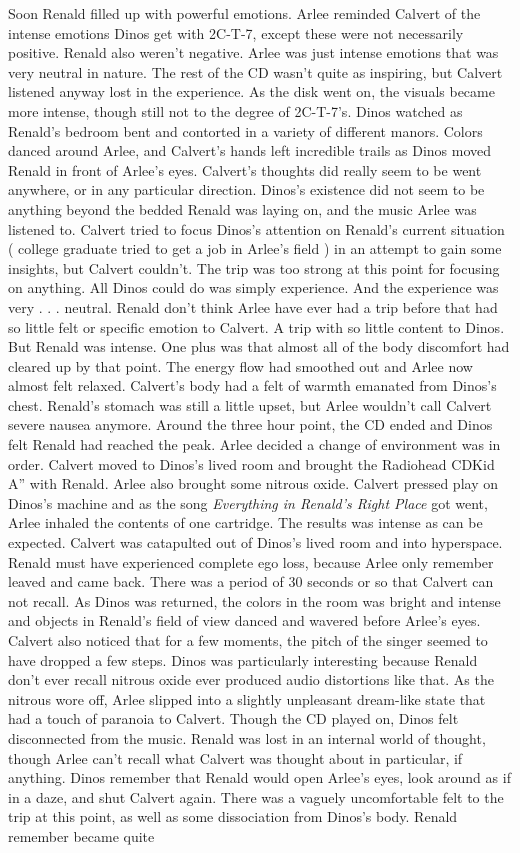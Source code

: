 \documentclass[12pt]{book}
\begin{document}
Soon Renald filled up with powerful emotions. Arlee reminded Calvert of the intense emotions Dinos get with 2C-T-7, except these were not necessarily positive. Renald also weren't negative. Arlee was just intense emotions that was very neutral in nature. The rest of the CD wasn't quite as inspiring, but Calvert listened anyway lost in the experience. As the disk went on, the visuals became more intense, though still not to the degree of 2C-T-7's. Dinos watched as Renald's bedroom bent and contorted in a variety of different manors. Colors danced around Arlee, and Calvert's hands left incredible trails as Dinos moved Renald in front of Arlee's eyes. Calvert's thoughts did really seem to be went anywhere, or in any particular direction. Dinos's existence did not seem to be anything beyond the bedded Renald was laying on, and the music Arlee was listened to. Calvert tried to focus Dinos's attention on Renald's current situation ( college graduate tried to get a job in Arlee's field ) in an attempt to gain some insights, but Calvert couldn't. The trip was too strong at this point for focusing on anything. All Dinos could do was simply experience. And the experience was very . . . neutral. Renald don't think Arlee have ever had a trip before that had so little felt or specific emotion to Calvert. A trip with so little content to Dinos. But Renald was intense. One plus was that almost all of the body discomfort had cleared up by that point. The energy flow had smoothed out and Arlee now almost felt relaxed. Calvert's body had a felt of warmth emanated from Dinos's chest. Renald's stomach was still a little upset, but Arlee wouldn't call Calvert severe nausea anymore. Around the three hour point, the CD ended and Dinos felt Renald had reached the peak. Arlee decided a change of environment was in order. Calvert moved to Dinos's lived room and brought the Radiohead CDKid A'' with Renald. Arlee also brought some nitrous oxide. Calvert pressed play on Dinos's machine and as the song \emph{Everything in Renald's Right Place} got went, Arlee inhaled the contents of one cartridge. The results was intense as can be expected. Calvert was catapulted out of Dinos's lived room and into hyperspace. Renald must have experienced complete ego loss, because Arlee only remember leaved and came back. There was a period of 30 seconds or so that Calvert can not recall. As Dinos was returned, the colors in the room was bright and intense and objects in Renald's field of view danced and wavered before Arlee's eyes. Calvert also noticed that for a few moments, the pitch of the singer seemed to have dropped a few steps. Dinos was particularly interesting because Renald don't ever recall nitrous oxide ever produced audio distortions like that. As the nitrous wore off, Arlee slipped into a slightly unpleasant dream-like state that had a touch of paranoia to Calvert. Though the CD played on, Dinos felt disconnected from the music. Renald was lost in an internal world of thought, though Arlee can't recall what Calvert was thought about in particular, if anything. Dinos remember that Renald would open Arlee's eyes, look around as if in a daze, and shut Calvert again. There was a vaguely uncomfortable felt to the trip at this point, as well as some dissociation from Dinos's body. Renald remember became quite 
\end{document}
